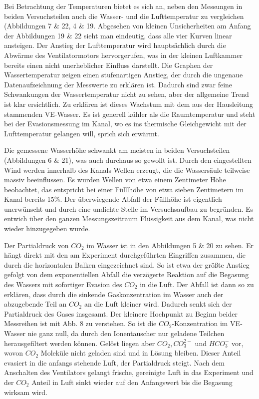 \documentclass[12pt]{article}
\begin{document}
Bei Betrachtung der Temperaturen bietet es sich an, neben den Messungen in beiden Versuchsteilen auch die Wasser- und die Lufttemperatur zu vergleichen (Abbildungen 7 \& 22, 4 \& 19. Abgesehen von kleinen Unsicherheiten am Anfang der Abbildungen 19 \& 22 sieht man eindeutig, dass alle vier Kurven linear ansteigen.
Der Anstieg der Lufttemperatur wird hauptsächlich durch die Abwärme des Ventilatormotors hervorgerufen, was in der kleinen Luftkammer bereits einen nicht unerheblicher Einfluss darstellt.
Die Graphen der Wassertemperatur zeigen einen stufenartigen Anstieg, der durch die ungenaue Datenaufzeichnung der Messwerte zu erklären ist. Dadurch sind zwar feine Schwankungen der Wassertemperatur nicht zu sehen, aber der allgemeine Trend ist klar ersichtlich. Zu erklären ist dieses Wachstum mit dem aus der Hausleitung stammenden VE-Wasser. Es ist generell kühler als die Raumtemperatur und steht bei der Evasionsmessung im Kanal, wo es ins thermische Gleichgewicht mit der Lufttemperatur gelangen will, sprich sich erwärmt.

Die gemessene Wasserhöhe schwankt am meisten in beiden Versuchsteilen (Abbildungen 6 \& 21), was auch durchaus so gewollt ist. Durch den eingestellten Wind werden innerhalb des Kanals Wellen erzeugt, die die Wassersäule teilweise massiv beeinflussen. Es wurden Wellen von etwa einem Zentimeter Höhe beobachtet, das entspricht bei einer Fülllhöhe von etwa sieben Zentimetern im Kanal bereits 15\%. Der überwiegende Abfall der Füllhöhe ist eigentlich unerwünscht und durch eine undichte Stelle im Versuchsaufbau zu begründen. Es entwich über den ganzen Messungszeitraum Flüssigkeit aus dem Kanal, was nicht wieder hinzugegeben wurde.

Der Partialdruck von $CO_2$ im Wasser ist in den Abbildungen 5 \& 20 zu sehen. Er hängt direkt mit den am Experiment durchgeführten Eingriffen zusammen, die durch die horizontalen Balken eingezeichnet sind. So ist etwa der größte Anstieg gefolgt von dem exponentiellen Abfall die verzögerte Reaktion auf die Begasung des Wassers mit sofortiger Evasion des $CO_2$ in die Luft. Der Abfall ist dann so zu erklären, dass durch die sinkende Gaskonzentration im Wasser auch der abzugebende Teil an $CO_2$ an die Luft kleiner wird. Dadurch senkt sich der Partialdruck des Gases insgesamt.
Der kleinere Hochpunkt zu Beginn beider Messreihen ist mit \cite{jaehne} Abb. 8
zu verstehen. So ist die $CO_2$-Konzentration im VE-Wasser nie ganz null, da durch den Ionentauscher nur geladene Teilchen herausgefiltert werden können. Gelöst liegen aber $CO_2, CO_3^{2-} $ und $HCO_3^-$ vor, wovon $CO_2$ Moleküle nicht geladen sind und in Lösung bleiben.
Dieser Anteil evasiert in die anfangs stehende Luft, der Partialdruck steigt. Nach dem Anschalten des Ventilators gelangt frische, gereinigte Luft in das Experiment und der $CO_2$ Anteil in Luft sinkt wieder auf den Anfangswert bis die Begasung wirksam wird.
\end{document}
